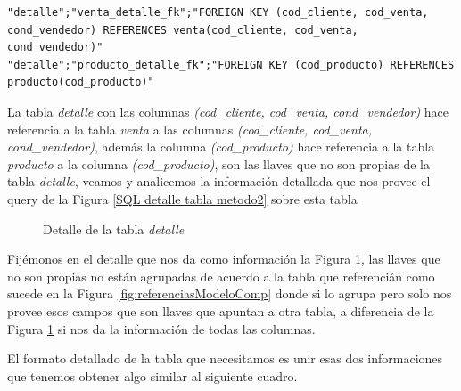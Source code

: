 \lstset{language=sql,breaklines=true}
\begin{lstlisting}
"detalle";"venta_detalle_fk";"FOREIGN KEY (cod_cliente, cod_venta, cond_vendedor) REFERENCES venta(cod_cliente, cod_venta, cond_vendedor)"
"detalle";"producto_detalle_fk";"FOREIGN KEY (cod_producto) REFERENCES producto(cod_producto)"
\end{lstlisting}
La tabla \textit{detalle} con las columnas \textit{(cod\_cliente, cod\_venta, cond\_vendedor)} hace referencia a la tabla \textit{venta} a las columnas \textit{(cod\_cliente, cod\_venta, cond\_vendedor)}, adem\'as la columna \textit{(cod\_producto)} hace referencia a la tabla \textit{producto} a la columna \textit{(cod\_producto)}, son las llaves que no son propias de la tabla \textit{detalle}, veamos y analicemos la informaci\'on detallada que nos provee el query de la Figura \ref{SQL detalle tabla metodo2} sobre esta tabla 
 
\begin{figure}[H]
\centering
{}
\caption{Detalle de la tabla \textit{detalle}} \label{fig:detalleTablaDetalle}
\end{figure}
Fij\'emonos en el detalle que nos da como informaci\'on la Figura \ref{fig:detalleTablaDetalle},  las llaves que no son propias no est\'an agrupadas de acuerdo a la tabla que referenci\'an como sucede en la Figura \ref{fig:referenciasModeloComp} donde si lo agrupa pero solo nos provee esos campos que son llaves que apuntan a otra tabla, a diferencia de la Figura \ref{fig:detalleTablaDetalle} si nos da la informaci\'on de todas las columnas.

El formato detallado de la tabla que necesitamos es unir esas dos informaciones que tenemos obtener algo similar al siguiente cuadro.

